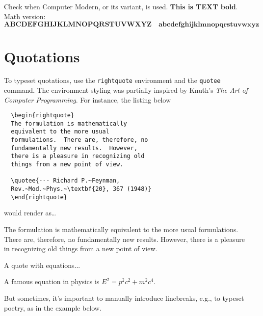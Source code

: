 \documentclass{article}
\begin{document}
Check when Computer Modern, or its variant, is used. \textbf{This is TEXT bold}.  Math version:
\begin{equation}
  \mathbf{ABCDEFGHIJKLMNOPQRSTUVWXYZ}\quad \mathbf{abcdefghijklmnopqrstuvwxyz}
\end{equation}

\section{Quotations}

\thetitle

\theheadtitle

To typeset quotations, use the \verb|rightquote| environment and the \verb|quotee| command.
The environment styling was partially inspired by Knuth's \emph{The Art of Computer Programming}.
For instance, the listing below

\begin{verbatim}
  \begin{rightquote}
  The formulation is mathematically
  equivalent to the more usual
  formulations.  There are, therefore, no
  fundamentally new results.  However,
  there is a pleasure in recognizing old
  things from a new point of view.

  \quotee{--- Richard P.~Feynman,
  Rev.~Mod.~Phys.~\textbf{20}, 367 (1948)}
  \end{rightquote}
\end{verbatim}

\noindent would render as\ldots

\begin{rightquote}
The formulation is mathematically
equivalent to the more usual
formulations.  There are, therefore, no
fundamentally new results.  However,
there is a pleasure in recognizing old
things from a new point of view.

\end{rightquote}

A quote with equations...

\begin{rightquote}
  A famous equation in physics is $E^{2} = p^{2}{c}^{2} + m^{2}c^{4}$.

\end{rightquote}


But sometimes, it's important to manually introduce linebreaks, e.g., to typeset poetry, as in the example below.
\end{document}
